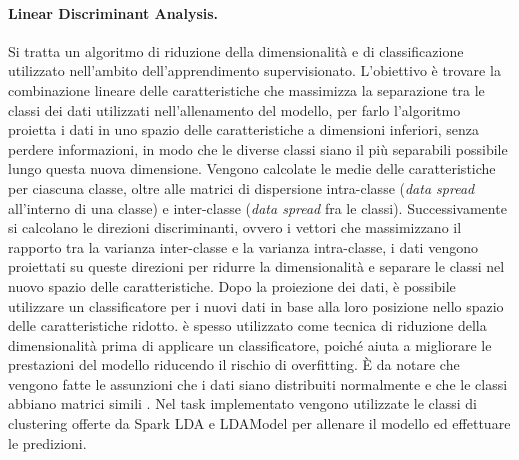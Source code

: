 \documentclass[12pt,a4paper,fleqn,titlepage]{report}
\begin{document}
        \paragraph{Linear Discriminant Analysis.}
        Si tratta un algoritmo di riduzione della dimensionalità e di classificazione utilizzato nell'ambito dell'apprendimento supervisionato. L'obiettivo è trovare la combinazione lineare delle caratteristiche che massimizza la separazione tra le classi dei dati utilizzati nell'allenamento del modello, per farlo l'algoritmo  proietta i dati in uno spazio delle caratteristiche a dimensioni inferiori, senza perdere informazioni, in modo che le diverse classi siano il più separabili possibile lungo questa nuova dimensione. Vengono calcolate le medie delle caratteristiche per ciascuna classe, oltre alle matrici di dispersione intra-classe (\emph{data spread} all'interno di una classe) e inter-classe (\emph{data spread} fra le classi). Successivamente si calcolano le direzioni discriminanti, ovvero i vettori che massimizzano il rapporto tra la varianza inter-classe e la varianza intra-classe, i dati vengono proiettati su queste direzioni per ridurre la dimensionalità e separare le classi nel nuovo spazio delle caratteristiche.
        Dopo la proiezione dei dati, è possibile utilizzare un classificatore per i nuovi dati in base alla loro posizione nello spazio delle caratteristiche ridotto.
         è spesso utilizzato come tecnica di riduzione della dimensionalità prima di applicare un classificatore, poiché aiuta a migliorare le prestazioni del modello riducendo il rischio di overfitting. È da notare che vengono fatte le assunzioni che i dati siano distribuiti normalmente e che le classi abbiano matrici simili \cite{tharwat:2017}.
        Nel task implementato vengono utilizzate le classi di clustering offerte da Spark LDA e LDAModel per allenare il modello ed effettuare le predizioni.
\end{document}
